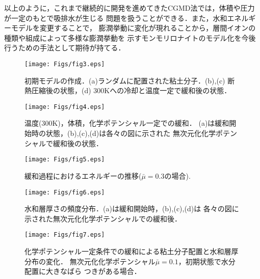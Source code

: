 以上のように，これまで継続的に開発を進めてきたCGMD法では，体積や圧力が一定のもとで吸排水が生じる
問題を扱うことができる．また，水和エネルギーモデルを変更することで，
膨潤挙動に変化が現れることから，層間イオンの種類や組成によって多様な膨潤挙動を
示すモンモリロナイトのモデル化を今後行うための手法として期待が持てる．
\begin{figure}[h]
	\begin{center}
	\texttt{[image: Figs/fig3.eps]} 
	\end{center}
	\caption{
		初期モデルの作成．(a)ランダムに配置された粘土分子．(b),(c) 断熱圧縮後の状態，(d)
		300Kへの冷却と温度一定で緩和後の状態．
	} 
	\label{fig:fig3}
\end{figure}
\begin{figure}[h]
	\begin{center}
	\texttt{[image: Figs/fig4.eps]} 
	\end{center}
	\caption{
		温度(300K)，体積，化学ポテンシャル一定での緩和．
		(a)は緩和開始時の状態，(b),(c),(d)は各々の図に示された
		無次元化化学ポテンシャルで緩和後の状態．
	} 
	\label{fig:fig4}
\end{figure}
\begin{figure}[h]
	\begin{center}
	\texttt{[image: Figs/fig5.eps]} 
	\end{center}
	\caption{
		緩和過程におけるエネルギーの推移($\bar{\mu}=0.3の場合$).
	} 
	\label{fig:fig5}
\end{figure}
\begin{figure}[h]
	\begin{center}
	\texttt{[image: Figs/fig6.eps]} 
	\end{center}
	\caption{
		水和層厚さの頻度分布．(a)は緩和開始時，(b),(c),(d)は
		各々の図に示された無次元化化学ポテンシャルでの緩和後．
	} 
	\label{fig:fig6}
\end{figure}
\begin{figure}[h]
	\begin{center}
	\texttt{[image: Figs/fig7.eps]} 
	\end{center}
	\caption{
		化学ポテンシャル一定条件での緩和による粘土分子配置と水和層厚分布の変化．
		無次元化化学ポテンシャル$\bar{\mu}=0.1$，初期状態で水分配置に大きなばら
		つきがある場合．
	} 
	\label{fig:fig7}
\end{figure}
